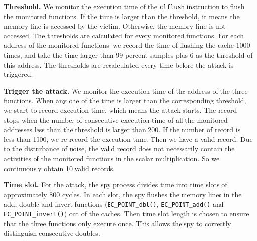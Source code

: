 
%
%
%



\noindent\textbf{Threshold.}
We monitor the execution time of the \verb+clflush+ instruction to flush the monitored functions.
If the time is larger than the threshold, it means the memory line is accessed by the victim.
Otherwise, the memory line is not accessed.
The thresholds are calculated for every monitored functions.
For each address of the monitored functions, we record the time of flushing the cache 1000 times, and take the time larger than 99 percent samples plus 6 as the threshold of this address.
The thresholds are recalculated every time before the attack is triggered.




\noindent\textbf{Trigger the attack.}
We monitor the execution time of the address of the three functions.
When any one of the time is larger than the corresponding threshold,
 we start to record execution time, which means the attack starts.
The record stops when the number of consecutive execution time of all the monitored addresses less than the threshold  is larger than 200.
If the number of record is less than 1000, we re-record the execution time.
Then we have a valid record.
 Due to the  disturbance of noise,
  the valid record does not necessarily contain the activities of the monitored functions in the scalar multiplication.
So we continuously obtain 10 valid records.


\noindent\textbf{Time slot.}
For the attack, the spy process divides time into time slots of approximately $800$ cycles.
In each slot, the spy flushes the memory lines in the add, double and invert functions (\verb+EC_POINT_dbl()+,  \verb+EC_POINT_add()+ and \verb+EC_POINT_invert()+) out of the caches.
Then time slot length is chosen to ensure that the three functions only execute once.
This allows the spy to correctly distinguish consecutive doubles.

